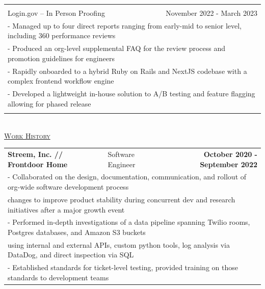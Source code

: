 \documentclass[letterpaper]{article}
\begin{document}
\begin{center}
\begin{tabular}{p{}p{}r}
		  \\
		  \\
			  \multicolumn{2}{p{0.5\textwidth}}{\quad Login.gov -- In Person Proofing}
			  &
			  {November 2022 - March 2023 \quad\quad\quad\quad}
		  \\
			  \multicolumn{3}{p{\textwidth}}{\quad\quad - Managed up to four direct reports ranging from early-mid to senior level, including 360 performance reviews} \\
			  \multicolumn{3}{p{\textwidth}}{\quad\quad - Produced an org-level supplemental FAQ for the review process and promotion guidelines for engineers} \\
			  \multicolumn{3}{p{\textwidth}}{\quad\quad - Rapidly onboarded to a hybrid Ruby on Rails and NextJS codebase with a complex frontend workflow engine} \\
			  \multicolumn{3}{p{\textwidth}}{\quad\quad - Developed a lightweight in-house solution to A/B testing and feature flagging allowing for phased release}
		  \\
			\\
		\end{tabular} \\
		\vspace{2.25in}
		\underline{\large \scshape Work History}
		\begin{tabular}{p{}p{}r}
				\textbf{Streem, Inc. // Frontdoor Home} &
				\quad\quad\quad\quad\quad\quad Software Engineer &
				\textbf{October 2020 - September 2022\quad}
			\\
				\multicolumn{3}{p{\textwidth}}{\quad\quad - Collaborated on the design, documentation, communication, and rollout of org-wide software development process}
			\\
				\multicolumn{3}{p{\textwidth}}{\quad\quad\quad changes to improve product stability during concurrent dev and research initiatives after a major growth event} 
			\\
				\multicolumn{3}{p{\textwidth}}{\quad\quad - Performed in-depth investigations of a data pipeline spanning Twilio rooms, Postgres databases, and Amazon S3 buckets}  
			\\
				\multicolumn{3}{p{\textwidth}}{\quad\quad\quad using internal and external APIs, custom python tools, log analysis via DataDog, and direct inspection via SQL}
			\\
				\multicolumn{3}{p{\textwidth}}{\quad\quad - Established standards for ticket-level testing, provided training on those standards to development teams}

\end{tabular}
\end{center}
\end{document}
